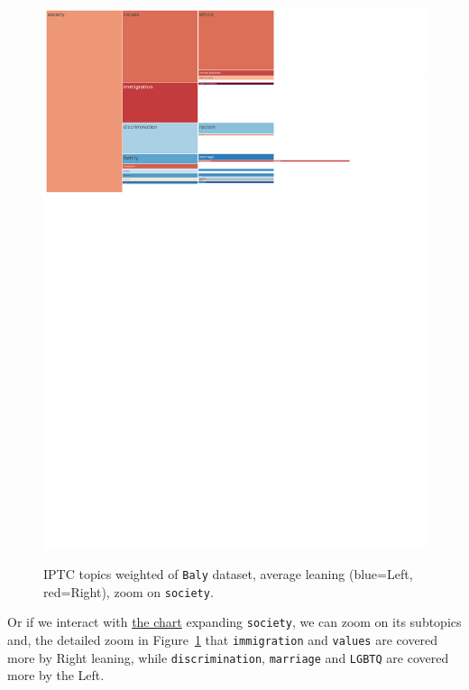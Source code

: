 \begin{figure}[!htbp]
    \centering
    \href{https://martinomensio.github.io/phd-project/figures/baly_iptc_weighted_by_leaning.html}{\includegraphics[trim={0.15cm 19.5cm 5cm 0.15cm},clip,width=\linewidth]{figures/baly_iptc_weighted_by_leaning_zoom_society.pdf}}
    \caption{IPTC topics weighted of \texttt{Baly} dataset, average leaning (blue=Left, red=Right), zoom on \texttt{society}.}
    \label{fig:baly_iptc_weighted_by_leaning_zoom_society}
\end{figure}

Or if we interact with \href{https://martinomensio.github.io/phd-project/figures/baly_iptc_weighted_by_leaning.html}{the chart} expanding \texttt{society}, we can zoom on its subtopics and, the detailed zoom in Figure~\ref{fig:baly_iptc_weighted_by_leaning_zoom_society} that \texttt{immigration} and \texttt{values} are covered more by Right leaning, while \texttt{discrimination}, \texttt{marriage}
and \texttt{LGBTQ} are covered more by the Left. 

